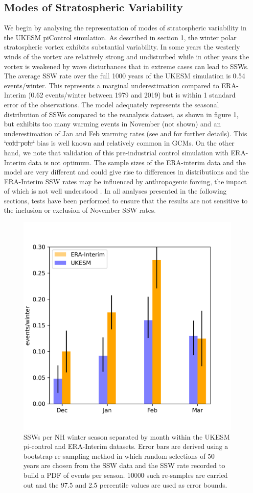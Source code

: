 \documentclass[wcd, manuscript]{copernicus}
\providecommand{\DIFadd}[1]{{\protect\color{blue}\uwave{#1}}} %
\providecommand{\DIFdel}[1]{{\protect\color{red}\sout{#1}}}                      %
\providecommand{\DIFaddbegin}{} %
\providecommand{\DIFaddend}{} %
\providecommand{\DIFdelbegin}{} %
\providecommand{\DIFdelend}{} %
\begin{document}
\subsection{Modes of Stratospheric Variability}
We begin by analysing the representation of modes of stratospheric variability in the UKESM piControl simulation. As described in section 1, the winter polar stratospheric vortex  exhibits substantial variability. In some years the westerly winds of the vortex are relatively strong and undisturbed while in other years the vortex is weakened by wave disturbances that in extreme cases can lead to SSWs. The average \DIFaddbegin \DIFadd{Nov-Mar }\DIFaddend SSW rate over the full 1000 years of the UKESM simulation is 0.54 events/winter. This represents a marginal underestimation compared to ERA-Interim (0.62 events/winter between 1979 and 2019) but is within 1 standard error of the observations. The model adequately represents the seasonal distribution of SSWs compared to the reanalysis dataset, as shown in figure 1, but exhibits too many warming events in November (not shown) and an underestimation of Jan and Feb warming rates (see \cite{Andrews2020} and \cite{Menary2018} for further details). This \DIFdelbegin \DIFdel{'cold pole' }\DIFdelend bias is well known and relatively common in GCMs. On the other hand, we note that validation of this pre-industrial control simulation with ERA-Interim data is not optimum. The sample sizes of the ERA-interim data and the model are very different and could give rise to differences in distributions \citep{Horan2017} and the ERA-Interim SSW rates may be influenced by anthropogenic forcing, the impact of which is not well understood \citep{Ayarz2020}. In all analyses presented in the following sections, tests have been performed to ensure that the results are not sensitive to the inclusion or exclusion of November SSW rates. 

\begin{center}
\begin{figure}[h!]
\noindent\includegraphics[width = 0.5\linewidth]{figures/SSW_hist_ERA_UKESM.png}
\caption{SSWs per NH winter season separated by month within the UKESM pi-control and ERA-Interim datasets. Error bars are derived using a bootstrap re-sampling method in which random selections of 50 years are chosen from the SSW data and the SSW rate recorded to build a PDF of events per season. 10000 such re-samples are carried out and the 97.5 and 2.5 percentile values are used as error bounds.}
\label{fig1}
\end{figure}
\end{center}
\end{document}
